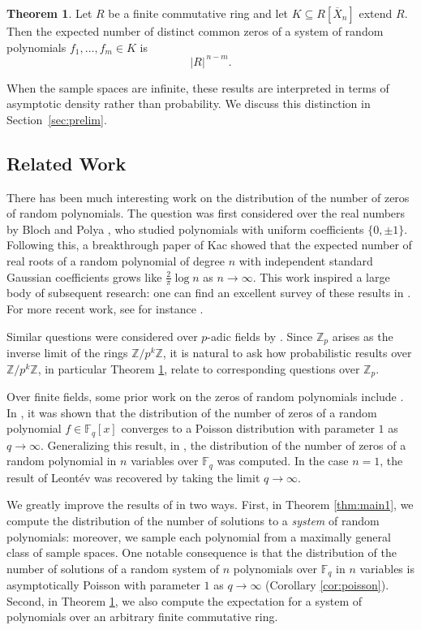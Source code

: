 \documentclass[12pt]{amsart}
\theoremstyle{definition}
\newtheorem{maintheorem}{Theorem}
\newcommand{\FF}{\mathbb{F} }
\newcommand{\ZZ}{\mathbb{Z} }
\begin{document}
\setcounter{maintheorem}{1}
\begin{maintheorem}\label{thm:ringmain1}
Let $R$ be a finite commutative ring and let $K \subseteq R[\overline{X}_n]$ extend $R$. Then the expected number of distinct common zeros of a system of random polynomials $f_1,\dots,f_m \in K$ is
\[
|R|^{\,n-m}.
\]
\end{maintheorem}

When the sample spaces are infinite, these results are interpreted in terms of asymptotic density rather than probability. We discuss this distinction in Section~\ref{sec:prelim}. 


\subsection{Related Work} There has been much interesting work on the distribution of the number of zeros of random polynomials. The question was first considered over the real numbers by Bloch and Polya \cite{BP32}, who studied polynomials with uniform coefficients $\{0, \pm 1 \}$. Following this, a breakthrough paper of Kac \cite{Kac43} showed that the expected number of real roots of a random polynomial of degree $n$ with independent standard Gaussian coefficients grows like $\frac{2}{\pi}\log n$ as $n \to \infty$. This work inspired a large body of subsequent research: one can find an excellent survey of these results in \cite{EK95}. For more recent work, see for instance \cite{DPSZ02, NV21}. 

Similar questions were considered over $p$-adic fields by \cite{Eva06, BCFG22}. Since $\ZZ_p$ arises as the inverse limit of the rings $\ZZ/p^k\ZZ$, it is natural to ask how probabilistic results over $\ZZ/p^k\ZZ$, in particular Theorem \ref{thm:ringmain1}, relate to corresponding questions over $\ZZ_p$.

Over finite fields, some prior work on the zeros of random polynomials include \cite{Odo92, Leo06, JMW25}. In \cite{Leo06}, it was shown that the distribution of the number of zeros of a random polynomial $f \in \FF_q[x]$ converges to a Poisson distribution with parameter $1$ as $q \to \infty$. Generalizing this result, in \cite{JMW25}, the distribution of the number of zeros of a random polynomial in $n$ variables over $\FF_q$ was computed. In the case $n = 1$, the result of Leont\'ev was recovered by taking the limit $q \to \infty$.

We greatly improve the results of \cite{Leo06, JMW25} in two ways. First, in Theorem \ref{thm:main1}, we compute the distribution of the number of solutions to a \emph{system} of random polynomials: moreover, we sample each polynomial from a maximally general class of sample spaces. One notable consequence is that the distribution of the number of solutions of a random system of $n$ polynomials over $\FF_q$ in $n$ variables is asymptotically Poisson with parameter $1$ as $q \to \infty$ (Corollary \ref{cor:poisson}).
Second, in Theorem \ref{thm:ringmain1}, we also compute the expectation for a system of polynomials over an arbitrary finite commutative ring.
\end{document}
